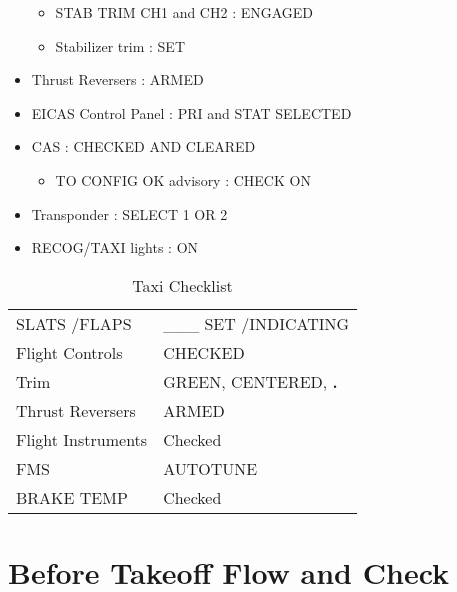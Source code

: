 \begin{itemize}
\begin{itemize}
\item STAB TRIM CH1 and CH2 : ENGAGED

\item Stabilizer trim : SET

\end{itemize}

\item Thrust Reversers : ARMED

\item EICAS Control Panel : PRI and STAT SELECTED

\item CAS : CHECKED AND CLEARED

\begin{itemize}
\item TO CONFIG OK advisory : CHECK ON

\end{itemize}

\item Transponder : SELECT 1 OR 2

\item RECOG\slash TAXI lights : ON

\end{itemize}

\begin{table}[htbp]
\begin{minipage}{\linewidth}
\setlength{\tymax}{0.5\linewidth}
\centering
\small
\caption{Taxi Checklist}
\label{taxichecklist}
\begin{tabulary}{\textwidth}{@{}ll@{}} \toprule
\midrule

 SLATS \slash  FLAPS  & \_\_\_ SET \slash  INDICATING \\
 Flight Controls & CHECKED    \\
 Trim    & GREEN, CENTERED, \textbf{.} \\
 Thrust Reversers & ARMED     \\
 Flight Instruments & Checked    \\
 FMS    & AUTOTUNE    \\
 BRAKE TEMP   & Checked      \\
\bottomrule

\end{tabulary}
\end{minipage}
\end{table}

\section{Before Takeoff Flow and Check}
\label{beforetakeoffflowandcheck}

